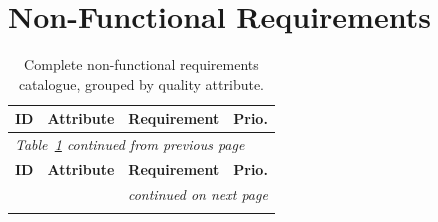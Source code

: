 \renewcommand{\arraystretch}{1.0}

\section{Non-Functional Requirements}
\label{app:nfr}

\renewcommand{\arraystretch}{1.25}
\begin{longtable}{p{} p{} p{} p{}}
\caption{Complete non-functional requirements catalogue, grouped by quality attribute.}
\label{tab:app-nfr}\\
\toprule
\textbf{ID} & \textbf{Attribute} & \textbf{Requirement} & \textbf{Prio.} \\
\midrule
\endfirsthead
\multicolumn{4}{l}{\small\itshape Table~\ref{tab:app-nfr} continued from previous page}\\
\toprule
\textbf{ID} & \textbf{Attribute} & \textbf{Requirement} & \textbf{Prio.} \\
\midrule
\endhead
\midrule
\multicolumn{4}{r}{\small\itshape continued on next page}\\
\endfoot
\bottomrule
\endlastfoot


\end{longtable}
